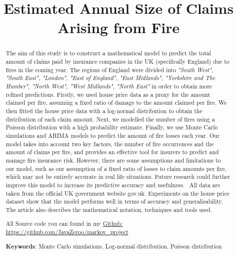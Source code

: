 \documentclass[12pt]{article}  %
\title{Estimated Annual Size of Claims Arising from Fire}  %
\begin{document}
\begin{abstract}
    The aim of this study is to construct a mathematical model to predict the total amount of claims paid by insurance companies in the UK (specifically England) due to fires in the coming year. The regions of England were divided into \emph{"South West", "South East", "London", "East of England", "East Midlands", "Yorkshire and The Humber", "North West", "West Midlands", "North East"} in order to obtain more refined predictions. Firstly, we used house price data as a proxy for the amount claimed per fire, assuming a fixed ratio of damage to the amount claimed per fire. We then fitted the house price data with a log-normal distribution to obtain the distribution of each claim amount. Next, we modelled the number of fires using a Poisson distribution with a high probability estimate. Finally, we use Monte Carlo simulations and ARIMA models to predict the amount of fire losses each year. Our model takes into account two key factors, the number of fire occurrences and the amount of claims per fire, and provides an effective tool for insurers to predict and manage fire insurance risk. However, there are some assumptions and limitations to our model, such as our assumption of a fixed ratio of losses to claim amounts per fire, which may not be entirely accurate in real life situations. Future research could further improve this model to increase its predictive accuracy and usefulness. \ 
    All data are taken from the official UK government website gov.uk\textsuperscript{\cite{fireguide,guide}}. Experiments on the house price dataset show that the model performs well in terms of accuracy and generalisability. The article also describes the mathematical notation, techniques and tools used.
    
    All Source code you can found in my \href{https://github.com/JavaZeroo/markov\_project}{Github: https://github.com/JavaZeroo/markov\_project}
    

    \vspace{5pt}
    \textbf{Keywords}: Monte Carlo simulations, Log-normal distribution, Poisson distribution



\end{abstract}

\maketitle  %
\tableofcontents  %
\end{document}
